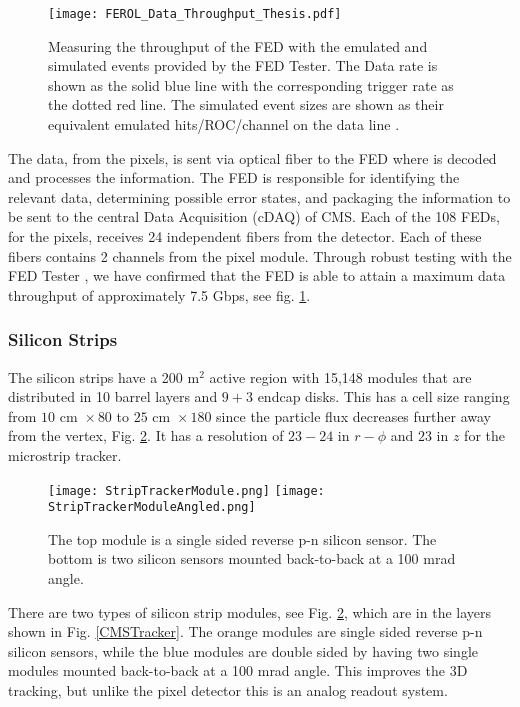 \begin{figure}
 	\centering
	\texttt{[image: FEROL\_Data\_Throughput\_Thesis.pdf]}
 	\caption[FED Throughput]{Measuring the throughput of the FED with the emulated and simulated events provided by the FED Tester. The Data rate is shown as the solid blue line with the corresponding trigger rate as the dotted red line. The simulated event sizes are shown as their equivalent emulated hits/ROC/channel on the data line \cite{kilpatrick_fed_2018}.}
 	\label{FEDThroughput} 
\end{figure}

The data, from the pixels, is sent via optical fiber to the FED where is decoded and processes the information. The FED is responsible for identifying the relevant data, determining possible error states, and packaging the information to be sent to the central Data Acquisition (cDAQ) of CMS. Each of the 108 FEDs, for the pixels, receives 24 independent fibers from the detector. Each of these fibers contains 2 channels from the pixel module. Through robust testing with the FED Tester \cite{kilpatrick_fed_2018}, we have confirmed that the FED is able to attain a maximum data throughput of approximately 7.5 Gbps, see fig. \ref{FEDThroughput}. 

\subsubsection{Silicon Strips}
\label{subsec:Strips}

The silicon strips have a 200 m$^2$ active region with 15,148 modules that are distributed in 10 barrel layers and $9+3$ endcap disks.
This has a cell size ranging from $10 \text{ cm } \times80$ \mum{} to $25 \text{ cm } \times 180$ \mum{} \cite{cms_collaboration_description_2014} since the particle flux decreases further away from the vertex, Fig. \ref{SiliconStrips}. It has a resolution of $23-24$ \mum{} in $r-\phi$ and $23$ \mum{} in $z$ for the microstrip tracker.

\begin{figure}[!htb]
	\centering
	\texttt{[image: StripTrackerModule.png]}
	\texttt{[image: StripTrackerModuleAngled.png]}
	\caption[Strip Tracker Module]{The top module is a single sided reverse p-n silicon sensor. The bottom is two silicon sensors mounted back-to-back at a 100 mrad angle.}
 	\label{SiliconStrips} 
\end{figure}

There are two types of silicon strip modules, see Fig. \ref{SiliconStrips}, which are in the layers shown in Fig. \ref{CMSTracker}. The orange modules are single sided reverse p-n silicon sensors, while the blue modules are double sided by having two single modules mounted back-to-back at a 100 mrad angle. This improves the 3D tracking, but unlike the pixel detector this is an analog readout system. 

